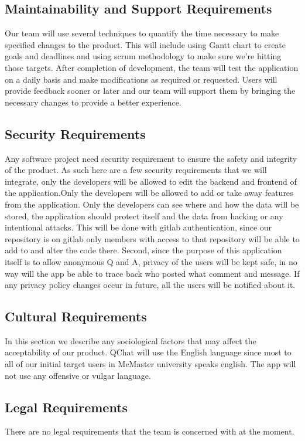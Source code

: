\documentclass[12pt, titlepage]{article}
\begin{document}
\subsection{Maintainability and Support Requirements}
Our team will use several techniques to quantify the time necessary to make specified changes to the product. This will include using Gantt chart to create goals and deadlines and using scrum methodology to make sure we’re hitting those targets. After completion of development, the team will test the application on a daily basis and make modifications as required or requested. Users will provide feedback sooner or later and our team will support them by bringing the necessary changes to provide a better experience. 

\subsection{Security Requirements}
Any software project need security requirement to ensure the safety and integrity of the product. As such here are a few security requirements that we will integrate, only the developers will be allowed to edit the backend and frontend of the application.Only the developers will be allowed to add or take away features from the application. Only the developers can see where and how the data will be stored, the application should protect itself and the data from hacking or any intentional attacks. This will be done with gitlab authentication, since our repository is on gitlab only members with access to that repository will be able to add to and alter the code there. Second, since the purpose of this application itself is to allow anonymous Q and A, privacy of the users will be kept safe, in no way will the app be able to trace back who posted what comment and message. If any privacy policy changes occur in future, all the users will be notified about it. 

\subsection{Cultural Requirements}
In this section we describe any sociological factors that may affect the acceptability of our product. QChat will use the English language since most to all of our initial target users in McMaster university speaks english. The app will not use any offensive or vulgar language.
        
\subsection{Legal Requirements}
There are no legal requirements that the team is concerned with at the moment. 
\end{document}
